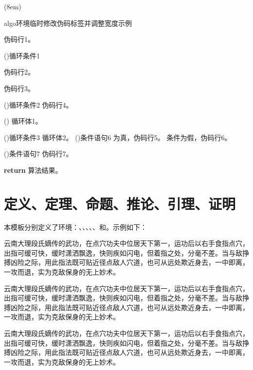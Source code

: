 \documentclass[print, doctor, vlined]{DissertUESTC}
\begin{document}
	\begin{algo}[!h](8em)
		\renewcommand{\algorithmcfname}{过程}  %
		\caption{algo环境临时修改伪码标签并调整宽度示例} \label{alg: algo环境修改伪码标签并调整宽度示例}
		伪码行1。
		
		\For(){循环条件1}{
			伪码行2。
			
			伪码行3。
			
			\DoWhile(){循环条件2}{
				伪码行4。
			}
			
			\Loop(){
				循环体1。
			}
			
			\Repeat(){循环条件3}{
				循环体2。
			}
			\eIf(){条件语句6}{
				为真，伪码行5。
			}{
				条件为假，伪码行6。
			}
			
			\If(){条件语句7}{
				伪码行7。
			}
		}
		\textbf{return} 算法结果。
	\end{algo}
	
	\clearpage
	\section{定义、定理、命题、推论、引理、证明}
	
	本模板分别定义了环境：、、、、、和。示例如下：
	
	\begin{definition}
		云南大理段氏嫡传的武功，在点穴功夫中位居天下第一，运功后以右手食指点穴，出指可缓可快，缓时潇洒飘逸，快则疾如闪电，但着指之处，分毫不差。当与敌挣搏凶险之际，用此指法既可贴近径点敌人穴道，也可从远处欺近身去，一中即离，一攻而退，实为克敌保身的无上妙术。
	\end{definition}
	
	\begin{theorem}
		云南大理段氏嫡传的武功，在点穴功夫中位居天下第一，运功后以右手食指点穴，出指可缓可快，缓时潇洒飘逸，快则疾如闪电，但着指之处，分毫不差。当与敌挣搏凶险之际，用此指法既可贴近径点敌人穴道，也可从远处欺近身去，一中即离，一攻而退，实为克敌保身的无上妙术。
	\end{theorem}
	
	\begin{proposition}
		云南大理段氏嫡传的武功，在点穴功夫中位居天下第一，运功后以右手食指点穴，出指可缓可快，缓时潇洒飘逸，快则疾如闪电，但着指之处，分毫不差。当与敌挣搏凶险之际，用此指法既可贴近径点敌人穴道，也可从远处欺近身去，一中即离，一攻而退，实为克敌保身的无上妙术。
	\end{proposition}
	
\end{document}
